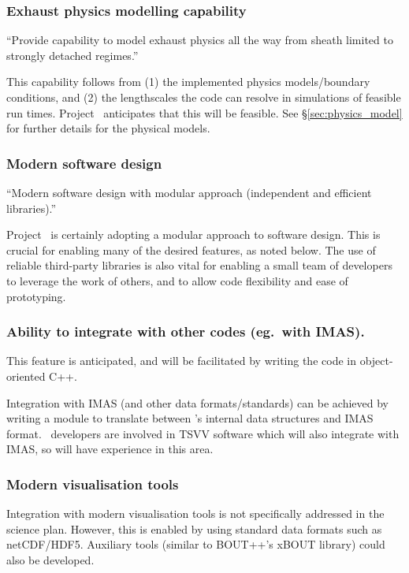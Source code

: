 \subsubsection{Exhaust physics modelling capability}

``Provide capability to model exhaust physics all the way from sheath
limited to strongly detached regimes.''

This capability follows from (1) the implemented physics models/boundary
conditions, and (2) the lengthscales the code can resolve in simulations of
feasible run times.
Project \nep \ anticipates that this will be feasible. 
See \S\ref{sec:physics_model} for further details for the physical
models.


\subsubsection{Modern software design}

``Modern software design with modular approach (independent and efficient libraries).''

Project \nep \ is certainly adopting a modular approach to software design.
This is crucial for enabling many of the desired features, as noted below.
The use of reliable third-party libraries is also vital for enabling a small
team of developers to leverage the work of others, and to allow code
flexibility and ease of prototyping.

\subsubsection{Ability to integrate with other codes (eg.\ with IMAS).}
This feature is anticipated, and will be facilitated by writing the code in
object-oriented C++.

Integration with IMAS (and other data formats/standards) can be achieved by
writing a module to translate between \nep's internal data structures and IMAS
format.
\nep\ developers are involved in TSVV software which will also integrate with
IMAS, so will have experience in this area.

\subsubsection{Modern visualisation tools}
Integration with modern visualisation tools is not specifically addressed in
the science plan.
However, this is enabled by using standard data formats such as netCDF/HDF5.
Auxiliary tools (similar to BOUT++'s xBOUT library) could also be developed.

